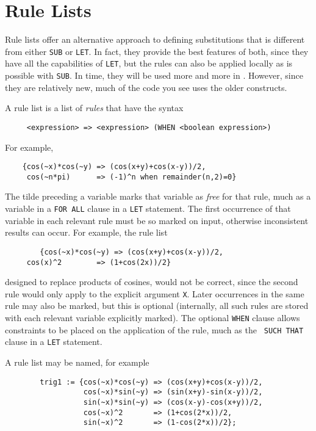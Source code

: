 \section{Rule Lists} 

Rule lists offer an alternative approach to defining substitutions that is
different from either {\tt SUB} or {\tt LET}.  In fact, they provide the
best features of both, since they have all the capabilities of {\tt LET},
but the rules can also be applied locally as is possible with {\tt SUB}.
In time, they will be used more and more in {\REDUCE}.  However, since they
are relatively new, much of the {\REDUCE} code you see uses the older
constructs.

A rule list is a list of {\em rules\/} that have the syntax
\begin{verbatim}
     <expression> => <expression> (WHEN <boolean expression>)
\end{verbatim}
For example,
\begin{verbatim}
	{cos(~x)*cos(~y) => (cos(x+y)+cos(x-y))/2,
	 cos(~n*pi)      => (-1)^n when remainder(n,2)=0}
\end{verbatim}

The tilde preceding a variable marks that variable as {\em free\/} for that
rule, much as a variable in a {\tt FOR ALL} clause in a {\tt LET}
statement.  The first occurrence of that variable in each relevant rule
must be so marked on input, otherwise inconsistent results can occur.
For example, the rule list
\begin{verbatim}
        {cos(~x)*cos(~y) => (cos(x+y)+cos(x-y))/2,
	 cos(x)^2        => (1+cos(2x))/2}
\end{verbatim}
designed to replace products of cosines, would not be correct, since the
second rule would only apply to the explicit argument {\tt X}.  Later
occurrences in the same rule may also be marked, but this is optional
(internally, all such rules are stored with each relevant variable
explicitly marked).  The optional {\tt WHEN} clause allows
constraints to be placed on the application of the rule, much as the {\tt
SUCH THAT} clause in a {\tt LET} statement.

A rule list may be named, for example
\begin{verbatim}
        trig1 := {cos(~x)*cos(~y) => (cos(x+y)+cos(x-y))/2,
                  cos(~x)*sin(~y) => (sin(x+y)-sin(x-y))/2,
                  sin(~x)*sin(~y) => (cos(x-y)-cos(x+y))/2,
                  cos(~x)^2       => (1+cos(2*x))/2,
                  sin(~x)^2       => (1-cos(2*x))/2};
\end{verbatim}

